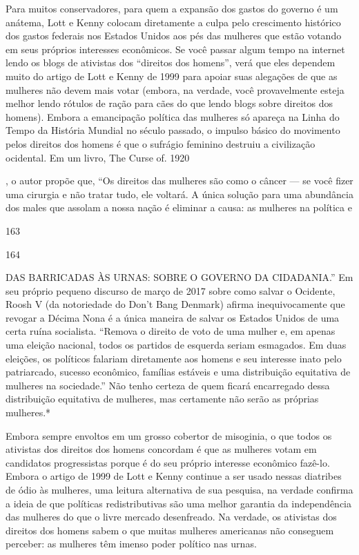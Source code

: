  \par 
Para muitos conservadores, para quem a expansão dos gastos do governo é um anátema, Lott e Kenny colocam diretamente a culpa pelo crescimento histórico dos gastos federais nos Estados Unidos aos pés das mulheres que estão votando em seus próprios interesses econômicos. Se você passar algum tempo na internet lendo os blogs de ativistas dos “direitos dos homens”, verá que eles dependem muito do artigo de Lott e Kenny de 1999 para apoiar suas alegações de que as mulheres não devem mais votar (embora, na verdade, você provavelmente esteja melhor lendo rótulos de ração para cães do que lendo blogs sobre direitos dos homens). Embora a emancipação política das mulheres só apareça na Linha do Tempo da História Mundial no século passado, o impulso básico do movimento pelos direitos dos homens é que o sufrágio feminino destruiu a civilização ocidental. Em um livro, The Curse of. {\color{blue} 1920 } {\par} , o autor propõe que, “Os direitos das mulheres são como o câncer — se você fizer uma cirurgia e não tratar tudo, ele voltará. A única solução para uma abundância dos males que assolam a nossa nação é eliminar a causa: as mulheres na política e
 \par 
163
 \par 
164
 \par 
DAS BARRICADAS ÀS URNAS: SOBRE O GOVERNO DA CIDADANIA.” Em seu próprio pequeno discurso de março de 2017 sobre como salvar o Ocidente, Roosh V (da notoriedade do Don’t Bang Denmark) afirma inequivocamente que revogar a Décima Nona é a única maneira de salvar os Estados Unidos de uma certa ruína socialista. “Remova o direito de voto de uma mulher e, em apenas uma eleição nacional, todos os partidos de esquerda seriam esmagados. Em duas eleições, os políticos falariam diretamente aos homens e seu interesse inato pelo patriarcado, sucesso econômico, famílias estáveis ​​e uma distribuição equitativa de mulheres na sociedade.” Não tenho certeza de quem ficará encarregado dessa distribuição equitativa de mulheres, mas certamente não serão as próprias mulheres.*
 \par 
Embora sempre envoltos em um grosso cobertor de misoginia, o que todos os ativistas dos direitos dos homens concordam é que as mulheres votam em candidatos progressistas porque é do seu próprio interesse econômico fazê-lo. Embora o artigo de 1999 de Lott e Kenny continue a ser usado nessas diatribes de ódio às mulheres, uma leitura alternativa de sua pesquisa, na verdade confirma a ideia de que políticas redistributivas são uma melhor garantia da independência das mulheres do que o livre mercado desenfreado. Na verdade, os ativistas dos direitos dos homens sabem o que muitas mulheres americanas não conseguem perceber: as mulheres têm imenso poder político nas urnas.

